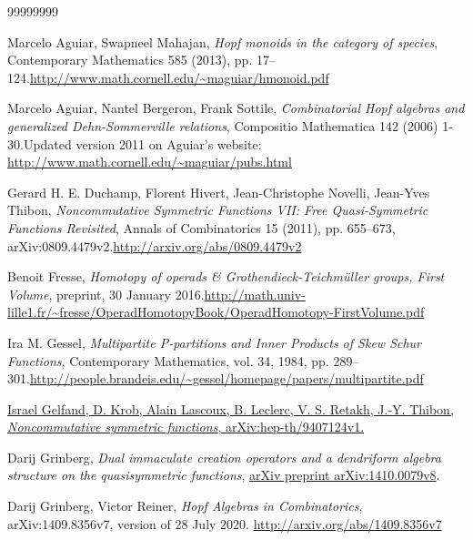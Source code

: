 \documentclass[numbers=enddot,12pt,final,onecolumn,notitlepage,abstracton]{scrartcl}%
\theoremstyle{definition}
\begin{document}
\begin{thebibliography}{99999999}                                                                                         %


Marcelo Aguiar, Swapneel Mahajan, \textit{Hopf
monoids in the category of species}, Contemporary Mathematics 585 (2013), pp.
17--124.\newline\url{http://www.math.cornell.edu/~maguiar/hmonoid.pdf}

Marcelo Aguiar, Nantel Bergeron, Frank Sottile,
\textit{Combinatorial Hopf algebras and generalized Dehn-Sommerville
relations}, Compositio Mathematica 142 (2006) 1-30.\newline Updated version
2011 on Aguiar's website: \url{http://www.math.cornell.edu/~maguiar/pubs.html}

Gerard H. E. Duchamp, Florent Hivert, Jean-Christophe
Novelli, Jean-Yves Thibon, \textit{Noncommutative Symmetric Functions VII:
Free Quasi-Symmetric Functions Revisited}, Annals of Combinatorics 15 (2011),
pp. 655--673, arXiv:0809.4479v2.\newline\url{http://arxiv.org/abs/0809.4479v2}

Benoit Fresse, \textit{Homotopy of operads \&
Grothendieck-Teichm\"{u}ller groups, First Volume}, preprint, 30 January
2016.\newline\url{http://math.univ-lille1.fr/~fresse/OperadHomotopyBook/OperadHomotopy-FirstVolume.pdf}

Ira M. Gessel, \textit{Multipartite P-partitions and
Inner Products of Skew Schur Functions}, Contemporary Mathematics, vol. 34,
1984, pp. 289--301.\newline\url{http://people.brandeis.edu/~gessel/homepage/papers/multipartite.pdf}

\href{https://arxiv.org/abs/hep-th/9407124v1}{Israel
Gelfand, D. Krob, Alain Lascoux, B. Leclerc, V. S. Retakh, J.-Y. Thibon,
\textit{Noncommutative symmetric functions}, arXiv:hep-th/9407124v1.}

Darij Grinberg, \textit{Dual immaculate creation
operators and a dendriform algebra structure on the quasisymmetric functions},
\href{http://arxiv.org/abs/1410.0079v8}{arXiv preprint arXiv:1410.0079v8}.

Darij Grinberg, Victor Reiner, \textit{Hopf Algebras
in Combinatorics}, arXiv:1409.8356v7, version of 28 July 2020. \newline\url{http://arxiv.org/abs/1409.8356v7}


\end{thebibliography}
\end{document}
